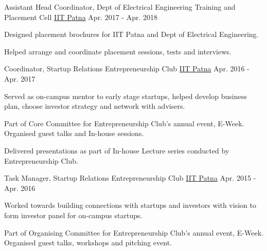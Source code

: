 
\begin{cvpositions}

\cvrole
	{Assistant Head Coordinator, Dept of Electrical Engineering} %
	{Training and Placement Cell} %
	{\href{https://www.iitp.ac.in}{IIT Patna}} %
	{Apr. 2017 - Apr. 2018} %
	{\begin{cvitems} %
		\item {Designed placement brochures for IIT Patna and Dept of Electrical Engineering.}
		\item {Helped arrange and coordinate placement sessions, tests and interviews.}
	\end{cvitems}}

\cvrole
	{Coordinator, Startup Relations} %
	{Entrepreneurship Club} %
	{\href{https://www.iitp.ac.in}{IIT Patna}} %
	{Apr. 2016 - Apr. 2017} %
	{\begin{cvitems} %
		\item {Served as on-campus mentor to early stage startups, helped develop business plan, choose investor strategy and network with advisers.}
		\item {Part of Core Committee for Entrepreneurship Club's annual event, E-Week. Organised guest talks and In-house sessions.}
		\item {Delivered presentations as part of In-house Lecture series conducted by Entrepreneurship Club.}
	\end{cvitems}}

\cvrole
	{Task Manager, Startup Relations} %
	{Entrepreneurship Club} %
	{\href{https://www.iitp.ac.in}{IIT Patna}} %
	{Apr. 2015 - Apr. 2016} %
	{\begin{cvitems} %
		\item {Worked towards building connections with startups and investors with vision to form investor panel for on-campus startups.}
		\item {Part of Organising Committee for Entrepreneurship Club's annual event, E-Week. Organised guest talks, workshops and pitching event.}
	\end{cvitems}}

\end{cvpositions}
